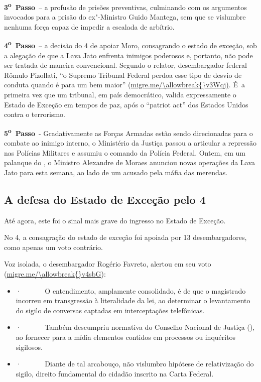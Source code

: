 \textbf{3\textsuperscript{o}~Passo}~-- a profusão de prisões
preventivas, culminando com os argumentos invocados para a prisão do
ex"-Ministro Guido Mantega, sem que se vislumbre nenhuma força capaz de
impedir a escalada de arbítrio.

\textbf{4\textsuperscript{o}~Passo}~-- a decisão do 4 de apoiar Moro,
consagrando o estado de exceção, sob a alegação de que a Lava Jato
enfrenta inimigos poderosos e, portanto, não pode ser tratada de maneira
convencional. Segundo o relator, desembargador federal Rômulo Pizollati,
``o Supremo Tribunal Federal perdoa esse tipo de desvio de conduta
quando é para um bem maior'' (\url{migre.me/\allowbreak{}v3Wqj)}. É~a primeira
vez que um tribunal, em país democrático, valida expressamente o Estado
de Exceção em tempos de paz, após o ``patriot act'' dos Estados Unidos
contra o terrorismo.

\textbf{5\textsuperscript{o}~Passo}~- Gradativamente as Forças Armadas
estão sendo direcionadas para o combate ao inimigo interno, o Ministério
da Justiça passou a articular a repressão nas Polícias Militares e
assumiu o comando da Polícia Federal. Ontem, em um palanque do , o
Ministro Alexandre de Moraes anunciou novas operações da Lava Jato para
esta semana, ao lado de um acusado pela máfia das merendas.

\subsection{A defesa do Estado de Exceção pelo 4}

Até agora, este foi o sinal mais grave do ingresso no Estado de Exceção.

No 4, a consagração do estado de exceção foi apoiada por 13
desembargadores, como apenas um voto contrário.

Voz isolada, o desembargador Rogério Favreto, alertou em seu voto
(\url{migre.me/\allowbreak{}v4sbG}):

\begin{itemize}
\itemsep1pt\parskip0pt
\item
  ·~~~~~~ O entendimento, amplamente consolidado, é de que o magistrado
  incorreu em transgressão à literalidade da lei, ao determinar o
  levantamento do sigilo de conversas captadas em interceptações
  telefônicas.
\item
  ·~~~~~~ Também descumpriu normativa do Conselho Nacional de Justiça
  (), ao fornecer para a mídia elementos contidos em processos ou
  inquéritos sigilosos.
\item
  ·~~~~~~ Diante de tal arcabouço, não vislumbro hipótese de
  relativização do sigilo, direito fundamental do cidadão inscrito na
  Carta Federal.
\end{itemize}

